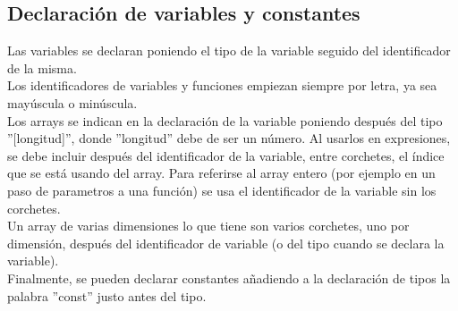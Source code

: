 \documentclass[a4paper, 12pt]{article}
\begin{document}
\subsection{Declaración de variables y constantes}
Las variables se declaran poniendo el tipo de la variable seguido del identificador de la misma.\\
Los identificadores de variables y funciones empiezan siempre por letra, ya sea mayúscula o minúscula.\\
Los arrays se indican en la declaración de la variable poniendo después del tipo ''[longitud]'', donde ''longitud'' debe de ser un número. Al usarlos en expresiones, se debe incluir después del identificador de la variable, entre corchetes, el índice que se está usando del array. Para referirse al array entero (por ejemplo en un paso de parametros a una función) se usa el identificador de la variable sin los corchetes.\\
Un array de varias dimensiones lo que tiene son varios corchetes, uno por dimensión, después del identificador de variable (o del tipo cuando se declara la variable).\\
Finalmente, se pueden declarar constantes añadiendo a la declaración de tipos la palabra ''const'' justo antes del tipo.
\end{document}
